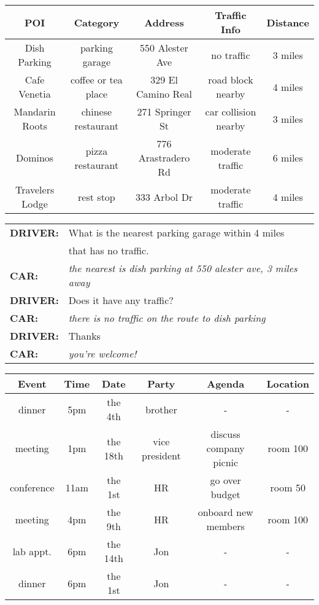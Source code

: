 \documentclass[11pt,a4paper]{article}
\begin{document}
\begin{figure*}
\small
\centering
  \begin{tabular}{|c|c|c|c|c|}
  \hline
  \bf POI& \bf Category & \bf Address & \bf Traffic Info& \bf Distance \\ \hline
  Dish Parking & parking garage & 550 Alester Ave & no traffic & 3 miles \\ 
  Cafe Venetia & coffee or tea place & 329 El Camino Real & road block nearby & 4 miles \\
  Mandarin Roots & chinese restaurant & 271 Springer St & car collision nearby & 3 miles \\ 
  Dominos & pizza restaurant & 776 Arastradero Rd & moderate traffic & 6 miles \\ 
  Travelers Lodge & rest stop & 333 Arbol Dr & moderate traffic & 4 miles \\
  \hline
  \end{tabular}

  \vspace{3mm}

  \newcommand\D{\emph{D}}

  \begin{tabular}{ll}
    \bf DRIVER: & What is the nearest parking garage within 4 miles\\
    &  that has no traffic.\\
    \bf CAR: & \emph{the nearest is dish parking at 550 alester ave, 3 miles away} \\
    \bf DRIVER: & Does it have any traffic?\\ 
    \bf CAR: & \emph{there is no traffic on the route to dish parking}\\
    \bf DRIVER: & Thanks\\
    \bf CAR: & \emph{you're welcome!}\\
  \end{tabular}

  \vspace{6mm}

  \small
\centering
  \begin{tabular}{|c|c|c|c|c|c|}
  \hline
  \bf Event & \bf Time & \bf Date & \bf Party & \bf Agenda & \bf Location \\ \hline
  dinner & 5pm & the 4th & brother & - & -\\ 
  meeting & 1pm & the 18th & vice president & discuss company picnic & room 100 \\ 
  conference & 11am & the 1st & HR & go over budget & room 50 \\ 
  meeting & 4pm & the 9th& HR & onboard new members & room 100\\ 
  lab appt. & 6pm & the 14th & Jon & - & - \\  
  dinner & 6pm & the 1st & Jon & - & -\\
  \hline
  \end{tabular}


\end{figure*}
\end{document}
